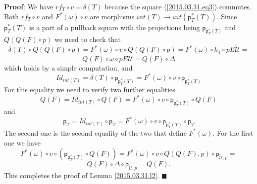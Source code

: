 \documentclass[12pt]{article}
\numberwithin{equation}{section}
\newenvironment{myproof}{{\bf Proof}:}{$\blacksquare$ \vskip 5mm }
\newcommand{\sr}{\rightarrow}
\newcommand{\wt}{\widetilde}
\newcommand{\p}{\mathsf{p}}
\newcommand{\U}{\mathcal{U}}
\begin{document}
\begin{myproof}
We have $rf_T\circ v=\delta(T)$ because the square (\ref{2015.03.31.eq3})
commutes.  Both $rf_T\circ v$ and $F^*(\omega)\circ v$ are morphisms $int(T)\sr
int(\p_T^*(T))$. Since $\p_T^*(T)$ is a part of a pullback square with the
projections being $\p_{\p_T^*(T)}$ and $Q(Q(F)\circ p)$ we need to check that
%
$$\delta(T)\circ Q(Q(F)\circ p)= F^*(\omega)\circ v\circ Q(Q(F)\circ
p)=F^*(\omega)\circ h_1\circ pE\wt{\U}=$$
$$Q(F)\circ \omega \circ pE\wt{\U}=Q(F)\circ \Delta$$
%
which holds by a simple computation, and
%
$$Id_{int(T)}=\delta(T)\circ \p_{\p_T^*(T)}=F^*(\omega)\circ v\circ
\p_{\p_T^*(T)}$$
%
For this equality we need to verify two further equalities
%
$$Q(F)=Id_{int(T)}\circ Q(F)=F^*(\omega)\circ v\circ \p_{\p_T^*(T)}\circ Q(F)$$
%
and
%
$$\p_T=Id_{int(T)}\circ \p_T=F^*(\omega)\circ v\circ \p_{\p_T^*(T)}\circ \p_T$$
%
The second one is the second equality of the two that define $F^*(\omega)$. For
the first one we have
%
$$F^*(\omega)\circ v\circ (\p_{\p_T^*(T)}\circ Q(F))=F^*(\omega)\circ v\circ
Q(Q(F),p)\circ \p_{\wt{\U},p}=$$
$$Q(F)\circ \Delta\circ \p_{\wt{\U},p}=Q(F).$$
%
This completes the proof of Lemma \ref{2015.03.31.l2}.
\end{myproof}
%
 
\end{document}
